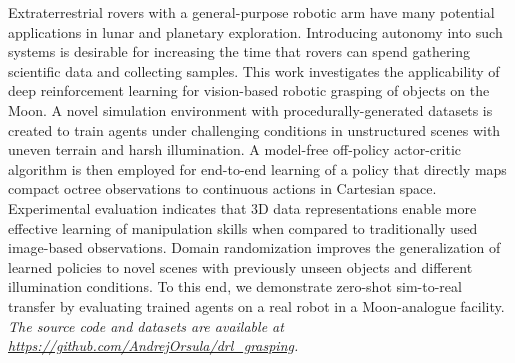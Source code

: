 Extraterrestrial rovers with a general-purpose robotic arm have many potential applications in lunar and planetary exploration. Introducing autonomy into such systems is desirable for increasing the time that rovers can spend gathering scientific data and collecting samples. This work investigates the applicability of deep reinforcement learning for vision-based robotic grasping of objects on the Moon. A novel simulation environment with procedurally-generated datasets is created to train agents under challenging conditions in unstructured scenes with uneven terrain and harsh illumination. A model-free off-policy actor-critic algorithm is then employed for end-to-end learning of a policy that directly maps compact octree observations to continuous actions in Cartesian space. Experimental evaluation indicates that 3D data representations enable more effective learning of manipulation skills when compared to traditionally used image-based observations. Domain randomization improves the generalization of learned policies to novel scenes with previously unseen objects and different illumination conditions. To this end, we demonstrate zero-shot sim-to-real transfer by evaluating trained agents on a real robot in a Moon-analogue facility.
\textit{The source code and datasets are available at \href{https://github.com/AndrejOrsula/drl_grasping}{https://github.com/AndrejOrsula/drl\_grasping}.}

